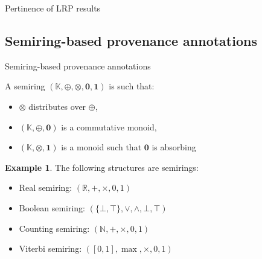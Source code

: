 \documentclass[aspectratio=169]{beamer}
\theoremstyle{definition}
\newtheorem*{exemple}{Example}
\begin{document}
\begin{frame}{Pertinence of LRP results}
    \begin{figure}
        \centering
    \end{figure}
\end{frame}

\subsection{Semiring-based provenance annotations}
\begin{frame}{Semiring-based provenance annotations}
    \begin{definition}[Semiring]
        A semiring $(\mathbb{K}, \oplus, \otimes, \mathbf{0}, \mathbf{1})$ is such that:
        \begin{itemize}[label=--, noitemsep]
            \item $\otimes$ distributes over $\oplus$,
            \item $(\mathbb{K}, \oplus, \mathbf{0})$ is a commutative monoid,
            \item $(\mathbb{K}, \otimes, \mathbf{1})$ is a monoid such that $\mathbf{0}$ is absorbing
        \end{itemize}
    \end{definition}

    \begin{exemple}
        The following structures are semirings:
        \begin{itemize}[label=--, noitemsep]
            \item Real semiring: $(\mathbb{R}, +, \times, 0, 1)$
            \item Boolean semiring: $(\{\bot, \top\}, \lor, \land, \bot, \top)$
            \item Counting semiring: $(\mathbb{N}, +, \times, 0, 1)$
            \item Viterbi semiring: $([0, 1], \max, \times, 0, 1)$
        \end{itemize}
    \end{exemple}
\end{frame}
\end{document}
